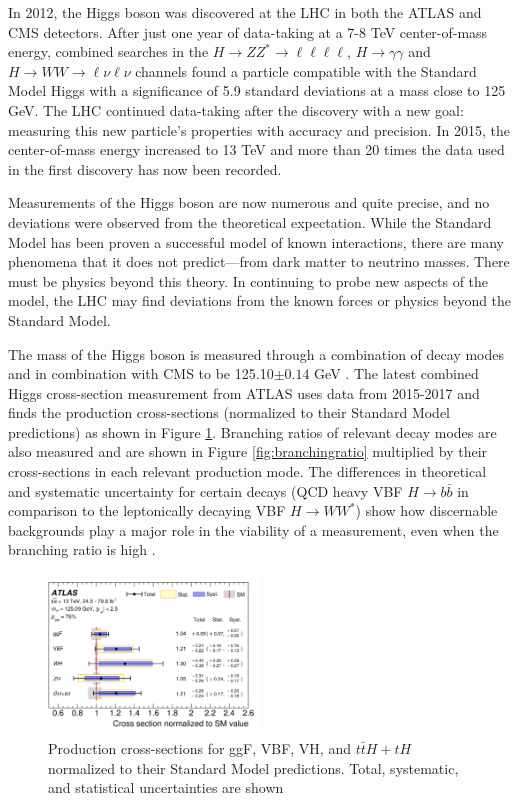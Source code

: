 In 2012, the Higgs boson was discovered at the LHC in both the ATLAS and CMS detectors. After just one year of data-taking at a 7-8 TeV center-of-mass energy, combined searches in the $H\rightarrow ZZ^*\rightarrow \ell\ell\ell\ell$, $H\rightarrow \gamma\gamma$ and $H\rightarrow WW \rightarrow \ell\nu\ell\nu$ channels found a particle compatible with the Standard Model Higgs with a significance of 5.9 standard deviations at a mass close to 125 GeV. The LHC continued data-taking after the discovery with a new goal: measuring this new particle's properties with accuracy and precision. In 2015, the center-of-mass energy increased to 13 TeV and more than 20 times the data used in the first discovery has now been recorded. 

Measurements of the Higgs boson are now numerous and quite precise, and no deviations were observed from the theoretical expectation. While the Standard Model has been proven a successful model of known interactions, there are many phenomena that it does not predict---from dark matter to neutrino masses. There must be physics beyond this theory. In continuing to probe new aspects of the model, the LHC may find deviations from the known forces or physics beyond the Standard Model.

The mass of the Higgs boson is measured through a combination of decay modes and in combination with CMS to be 125.10$\pm 0.14$ GeV \cite{PDG}. The latest combined Higgs cross-section measurement from ATLAS uses data from 2015-2017 and finds the production cross-sections (normalized to their Standard Model predictions) as shown in Figure \ref{fig:productioncrosssection}. Branching ratios of relevant decay modes are also measured and are shown in Figure \ref{fig:branchingratio} multiplied by their cross-sections in each relevant production mode. The differences in theoretical and systematic uncertainty for certain decays (QCD heavy VBF $H\rightarrow b\bar{b}$ in comparison to the leptonically decaying VBF $H\rightarrow WW^*$) show how discernable backgrounds play a major role in the viability of a measurement, even when the branching ratio is high \cite{HiggsCurrent}.  
\begin{figure}[H]
        \centering
    \includegraphics[width=0.5\textwidth] {Pictures/productioncrosssection.png}\hspace{1cm}
    \caption{Production cross-sections for ggF, VBF, VH, and $t\bar{t}H+tH$ normalized to their Standard Model predictions. Total, systematic, and statistical uncertainties are shown \cite{HiggsCurrent}}
    \label{fig:productioncrosssection}
\end{figure}

